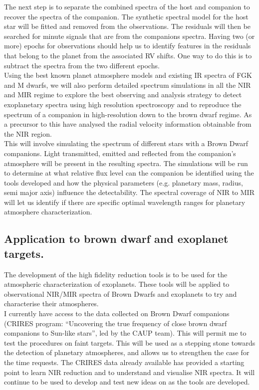 \documentclass[pdftex,12pt,a4paper]{article}
\begin{document}
The next step is to separate the combined spectra of the host and companion to recover the spectra of the companion. The synthetic spectral model for the host star will be fitted and removed from the observations. The residuals will then be searched for minute signals that are from the companions spectra. Having two (or more) epochs for observations should help us to identify features in the residuals that belong to the planet from the associated {RV} shifts. One way to do this is to subtract the spectra from the two different epochs. \\

Using the best known planet atmosphere models and existing IR spectra of FGK and M dwarfs, we will also perform detailed spectrum simulations in all the NIR and MIR regime to explore the best observing and analysis strategy to detect exoplanetary spectra using high resolution spectroscopy and to reproduce the spectrum of a companion in high-resolution down to the brown dwarf regime. As a precursor to this \citet{Figueria2015prep} have analysed the radial velocity information obtainable from the NIR region.\\

This will involve simulating the spectrum of different stars with a Brown Dwarf companions. Light transmitted, emitted and reflected from the companion's atmosphere will be present in the resulting spectra. The simulations will be run to determine at what relative flux level can the companion be identified using the tools developed and how the physical parameters (e.g. planetary mass, radius,  semi major axis) influence the detectability. The spectral coverage of NIR to MIR will let us identify if there are specific optimal wavelength ranges for planetary atmosphere characterization.

\subsection{Application to brown dwarf and exoplanet targets.}

The development of the high fidelity reduction tools is to be used for the atmospheric characterization of exoplanets. These tools will be applied to observational NIR/MIR spectra of Brown Dwarfs and exoplanets to try and characterise their atmospheres. \\

I currently have access to the data collected on Brown Dwarf companions (CRIRES program: ``Uncovering the true frequency of close brown dwarf companions to Sun-like stars'', led by the CAUP team). This will permit me to test the procedures on faint targets. This will be used as a stepping stone towards the detection of planetary atmospheres, and allows us to strengthen the case for the time requests. The CRIRES data already available has provided a starting point to learn NIR reduction and to understand and visualise NIR spectra. It will continue to be used to develop and test new ideas on as the tools are developed.\\
\end{document}
